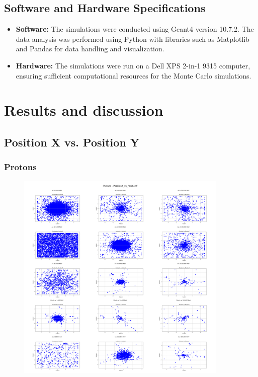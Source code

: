 \documentclass{article}
\begin{document}
\subsection{Software and Hardware Specifications}

\begin{itemize}
    \item \textbf{Software:} The simulations were conducted using Geant4 version 10.7.2. The data analysis was performed using Python with libraries such as Matplotlib and Pandas for data handling and visualization.

    \item \textbf{Hardware:} The simulations were run on a Dell XPS 2-in-1 9315 computer, ensuring sufficient computational resources for the Monte Carlo simulations.
\end{itemize}

\section{Results and discussion}

\subsection{Position X vs. Position Y}

\subsubsection{Protons}

\begin{figure}[H]
\centering
\includegraphics[width=0.9\textwidth]{images/Combined Plots/PositionX_vs_PositionY_p.png}
\end{figure}\
\end{document}
